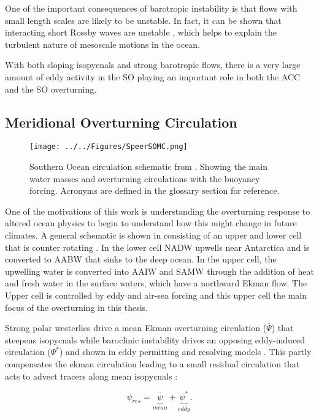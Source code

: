 One of the important consequences of barotropic instability is that flows with small length scales are likely to be unstable. In fact, it can be shown that interacting short Rossby waves are unstable \citep{Gill1974a}, which helps to explain the turbulent nature of mesoscale motions in the ocean.

With both sloping isopycnals and strong barotropic flows, there is a very large amount of eddy activity in the SO playing an important role in both the ACC and the \gls{SO} overturning.

\subsection{Meridional Overturning Circulation}
\begin{figure}[H]
\centering
\texttt{[image: ../../Figures/SpeerSOMC.png]}
\caption{Southern Ocean circulation schematic from \citet{speer2000}. Showing the main water masses and overturning circulations with the buoyancy forcing. Acronyms are defined in the glossary section for reference.}
\label{fig:SpeerSOMOC}
\end{figure}

One of the motivations of this work is understanding the overturning response to altered ocean physics to begin to understand how this might change in future climates. A general schematic is shown in  consisting of an upper and lower cell that is counter rotating \citep{Meredith2012}.  In the lower cell \gls{NADW} upwells near Antarctica and is converted to \gls{AABW} that sinks to the deep ocean. In the upper cell, the upwelling water is converted into \gls{AAIW} and \gls{SAMW} through the addition of heat and fresh water in the surface waters, which have a northward Ekman flow. The Upper cell is controlled by eddy and air-sea forcing \citep{rintoul2012southern} and this upper cell the main focus of the overturning in this thesis.

Strong polar westerlies drive a mean Ekman overturning circulation ($\overline{\Psi}$) that steepens isopycnals while baroclinic instability drives an opposing eddy-induced circulation ($\Psi ^*$) \citep{Marshall2003} and shown in eddy permitting and resolving models \cite{hallberg2006}. This partly compensates the ekman circulation leading to a small residual circulation that acts to advect tracers along mean isopycnals \citep{speer2000}:

\begin{equation}
\psi_{res}=\underbrace{\overline{\psi}}_{mean}+\underbrace{\psi ^*}_{eddy}.
\label{eq:res1}
\end{equation}
 
